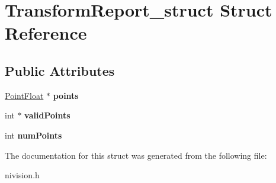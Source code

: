 \hypertarget{structTransformReport__struct}{\section{\-Transform\-Report\-\_\-struct \-Struct \-Reference}
\label{structTransformReport__struct}
}
\subsection*{\-Public \-Attributes}
\begin{DoxyCompactItemize}
\item 
\hypertarget{structTransformReport__struct_a5ba409fc7b6e4fc319b295f09cffbb61}{\hyperlink{structPointFloat__struct}{\-Point\-Float} $\ast$ {\bfseries points}}\label{structTransformReport__struct_a5ba409fc7b6e4fc319b295f09cffbb61}

\item 
\hypertarget{structTransformReport__struct_a251fabc488cea822f45cf6bc033ef7c1}{int $\ast$ {\bfseries valid\-Points}}\label{structTransformReport__struct_a251fabc488cea822f45cf6bc033ef7c1}

\item 
\hypertarget{structTransformReport__struct_a874ce8e183a4c5b284113a89f24ded33}{int {\bfseries num\-Points}}\label{structTransformReport__struct_a874ce8e183a4c5b284113a89f24ded33}

\end{DoxyCompactItemize}


\-The documentation for this struct was generated from the following file\-:\begin{DoxyCompactItemize}
\item 
nivision.\-h\end{DoxyCompactItemize}
